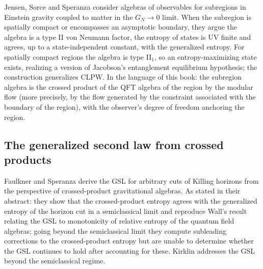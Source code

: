 Jensen, Sorce and Speranza \cite{JSS2023} consider algebras of observables for subregions in Einstein gravity coupled to matter in the $G_N\to0$ limit. When the subregion is spatially compact or encompasses an asymptotic boundary, they argue the algebra is a type II von Neumann factor, the entropy of states is UV finite and agrees, up to a state-independent constant, with the generalized entropy. For spatially compact regions the algebra is type II$_1$, so an entropy-maximizing state exists, realizing a version of Jacobson's entanglement equilibrium hypothesis; the construction generalizes CLPW. In the language of this book: the subregion algebra is the crossed product of the QFT algebra of the region by the modular flow (more precisely, by the flow generated by the constraint associated with the boundary of the region), with the observer's degree of freedom anchoring the region.

\subsection{The generalized second law from crossed products}

Faulkner and Speranza \cite{FaulknerSperanza2024} derive the GSL for arbitrary cuts of Killing horizons from the perspective of crossed-product gravitational algebras. As stated in their abstract: they show that the crossed-product entropy agrees with the generalized entropy of the horizon cut in a semiclassical limit and reproduce Wall's result relating the GSL to monotonicity of relative entropy of the quantum field algebras; going beyond the semiclassical limit they compute subleading corrections to the crossed-product entropy but are unable to determine whether the GSL continues to hold after accounting for these. Kirklin \cite{Kirklin2024GSL} addresses the GSL beyond the semiclassical regime.

